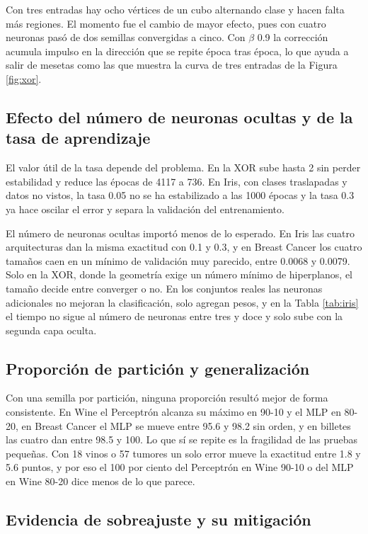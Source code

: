 \documentclass[11pt,letterpaper]{article}
\begin{document}
Con tres entradas hay ocho vértices de un cubo alternando clase y hacen falta más regiones. El momento fue el cambio de mayor efecto, pues con cuatro neuronas pasó de dos semillas convergidas a cinco. Con $\beta$ 0.9 la corrección acumula impulso en la dirección que se repite época tras época, lo que ayuda a salir de mesetas como las que muestra la curva de tres entradas de la Figura \ref{fig:xor}.

\subsection{Efecto del número de neuronas ocultas y de la tasa de aprendizaje}

El valor útil de la tasa depende del problema. En la XOR sube hasta 2 sin perder estabilidad y reduce las épocas de 4117 a 736. En Iris, con clases traslapadas y datos no vistos, la tasa 0.05 no se ha estabilizado a las 1000 épocas y la tasa 0.3 ya hace oscilar el error y separa la validación del entrenamiento.

El número de neuronas ocultas importó menos de lo esperado. En Iris las cuatro arquitecturas dan la misma exactitud con 0.1 y 0.3, y en Breast Cancer los cuatro tamaños caen en un mínimo de validación muy parecido, entre 0.0068 y 0.0079. Solo en la XOR, donde la geometría exige un número mínimo de hiperplanos, el tamaño decide entre converger o no. En los conjuntos reales las neuronas adicionales no mejoran la clasificación, solo agregan pesos, y en la Tabla \ref{tab:iris} el tiempo no sigue al número de neuronas entre tres y doce y solo sube con la segunda capa oculta.

\subsection{Proporción de partición y generalización}
\label{sec:particiones}

Con una semilla por partición, ninguna proporción resultó mejor de forma consistente. En Wine el Perceptrón alcanza su máximo en 90-10 y el MLP en 80-20, en Breast Cancer el MLP se mueve entre 95.6 y 98.2 sin orden, y en billetes las cuatro dan entre 98.5 y 100. Lo que sí se repite es la fragilidad de las pruebas pequeñas. Con 18 vinos o 57 tumores un solo error mueve la exactitud entre 1.8 y 5.6 puntos, y por eso el 100 por ciento del Perceptrón en Wine 90-10 o del MLP en Wine 80-20 dice menos de lo que parece.

\subsection{Evidencia de sobreajuste y su mitigación}
\end{document}
